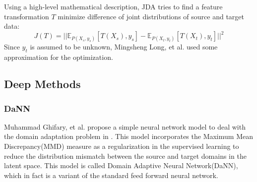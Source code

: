 \documentclass[conference]{IEEEtran}
\begin{document}
Using a high-level mathematical description, JDA tries to find a feature transformation $T$ minimize difference of joint distributions of source and target data:
\begin{equation}
J(T) = || \mathbb{E}_{P(X_s,y_s)}[T(X_s), y_s] - \mathbb{E}_{P(X_t,y_t)}[T(X_t), y_t]||^2
\end{equation}
Since $y_t$ is assumed to be unknown, Mingsheng Long, et al. used some approximation for the optimization.

\subsection{Deep Methods}
\subsubsection{DaNN}
Muhammad Ghifary, et al. propose a simple neural network model to deal with the domain adaptation problem in \cite{DaNN}. This model incorporates the Maximum Mean Discrepancy(MMD) measure as a regularization in the supervised learning to reduce the distribution mismatch between the source and target domains in the latent space. This model is called Domain Adaptive Neural Network(DaNN), which in fact is a variant of the standard feed forward neural network.
\end{document}
